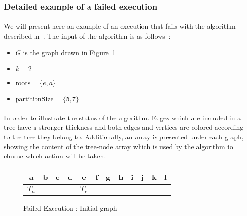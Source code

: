 \subsubsection{\label{counter-example}Detailed example of a failed execution}


\paragraph{}
We will present here an example of an execution that fails with the algorithm
described in~\cite{JS94}. The input of the algorithm is as follows~:
\begin{itemize}
\item $G$ is the graph drawn in Figure~\ref{FE_K2_init}
\item $k = 2$
\item $\mathrm{roots} = \{ e, a \}$
\item $\mathrm{partitionSize} = \{ 5, 7\}$
\end{itemize}

\paragraph{}
In order to illustrate the status of the algorithm. Edges which are
included in a tree have a stronger thickness and both edges and vertices are
colored according to the tree they belong to. Additionally, an array is
presented under each graph, showing the content of the tree-node array which
is used by the algorithm to choose which action will be taken.

\begin{figure}[H]
  \caption{\label{FE_K2_init}Failed Execution : Initial graph}
  \begin{center}
    \begin{tikzpicture}[scale=0.9,transform shape]
      
    \end{tikzpicture}

    \begin{tabular}{|c|c|c|c|c|c|c|c|c|c|c|c|}
\hline
a & b & c & d & e & f & g & h & i & j & k & l\\
\hline
$T_a$ & & & & $T_e$ & & & & & & &\\
\hline
    \end{tabular}
  \end{center}
\end{figure}

